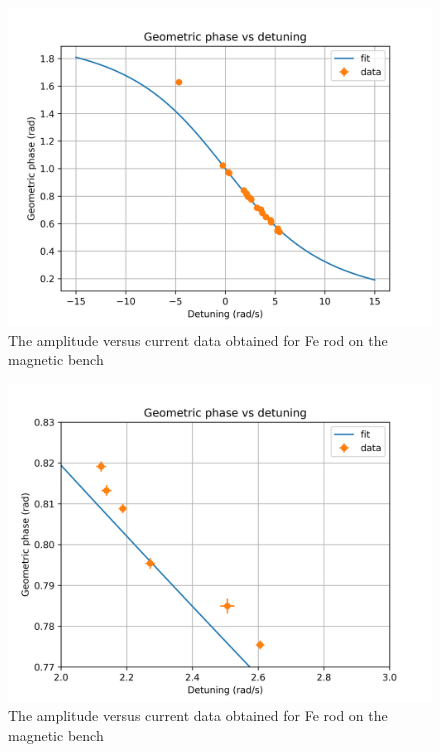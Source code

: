 \begin{figure}[H]
	\centering
	\includegraphics[scale=0.4]{Geometric_phase.png}
	\caption{The amplitude versus current data obtained for Fe rod on the magnetic bench}
	\label{fig:first_sq}
\end{figure}

\begin{figure}[H]
	\centering
	\includegraphics[scale=0.4]{Zoomed_in_geometric_phase.png}
	\caption{The amplitude versus current data obtained for Fe rod on the magnetic bench}
	\label{fig:first_sq}
\end{figure}
\setcounter{equation}{0}
\setcounter{table}{0}
\setcounter{figure}{0}
